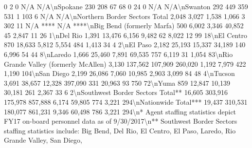 \documentclass[
  12pt,
  openany]{book}
\newenvironment{Shaded}{\begin{snugshade}}{\end{snugshade}}
\begin{document}
\begin{Shaded}
\begin{Highlighting}[]
0                2               0              N/A      N/A\textbackslash{}nSpokane                                           230                208                       67                     68                 0               24               0              N/A      N/A\textbackslash{}nSwanton                                           292               449                       359                    531                 1               103               6             N/A      N/A\textbackslash{}nNorthern Border Sectors Total                    2,048             3,027                     1,538                  1,066                3               302              11        N/A ****    N/A   ****\textbackslash{}nBig Bend (formerly Marfa)                         500              6,002                     3,346                  40,852              45              2,847             11             26       1\textbackslash{}nDel Rio                                          1,391             13,476                    6,156                  9,482               62              8,022             12             99       18\textbackslash{}nEl Centro                                         870              18,633                    5,812                  5,554              484              1,413             34             4        2\textbackslash{}nEl Paso                                          2,182             25,193                   15,337                  34,189             140              6,996             54             44       8\textbackslash{}nLaredo                                           1,666             25,460                    7,891                  69,535             757              6,119             31            1,054     83\textbackslash{}nRio Grande Valley (formerly McAllen)             3,130            137,562                  107,909                 260,020            1,192             7,979            422            1,190    104\textbackslash{}nSan Diego                                        2,199             26,086                    7,060                  10,985            2,903             3,099             84             48       4\textbackslash{}nTucson                                           3,691             38,657                   12,328                 397,090             331             20,963             93            750       72\textbackslash{}nYuma                                              859              12,847                   10,139                  30,181             261              2,367             33             6        2\textbackslash{}nSouthwest Border Sectors Total**                16,605            303,916                  175,978                 857,888            6,174            59,805            774            3,221    294\textbackslash{}nNationwide Total***                             19,437            310,531                  180,077                 861,231            9,346            60,498            786            3,221    294\textbackslash{}n* Agent staffing statistics depict FY17 on{-}board personnel data as of 9/30/2017\textbackslash{}n** Southwest Border Sectors staffing statistics include: Big Bend, Del Rio, El Centro, El Paso, Laredo, Rio Grande Valley, San Diego, 
\end{Highlighting}
\end{Shaded}
\end{document}
